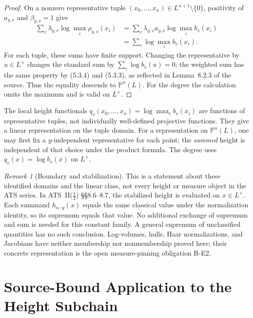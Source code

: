 \documentclass[11pt,a4paper]{article}
\theoremstyle{definition}
\theoremstyle{remark}
\newtheorem{remark}[theorem]{Remark}
\begin{document}
\begin{proof}
On a nonzero representative tuple $(x_0,\dots,x_n)\in L^{n+1}\setminus\{0\}$,
positivity of $a_{y,v}$ and $\beta_{y,v}=1$ give
\begin{align*}
\sum_v\lambda_{y,v}\log\max_i\rho_{y,v}(x_i)
&=\sum_v\lambda_{y,v}a_{y,v}\log\max_i b_v(x_i)\\
&=\sum_v\log\max_i b_v(x_i).
\end{align*}
For each tuple, these sums have finite support. Changing the representative
by $u\in L^\times$ changes the standard sum by
$\sum_v\log b_v(u)=0$; the weighted sum has the same property by (5.3.4)
and (5.3.3), as reflected in Lemma~8.2.3 of the source.
Thus the equality descends to $\mathbb P^n(L)$.
For the degree the calculation omits the maximum and is valid on
$L^\times$.
\end{proof}

The local height functionals
$q_v(x_0,\dots,x_n)=\log\max_i b_v(x_i)$ are functions of representative
tuples, not individually well-defined projective functions.
They give a linear representation on the tuple domain.
For a representation on $\mathbb P^n(L)$, one may first fix a
$y$-independent representative for each point; the \emph{summed} height
is independent of that choice under the product formula.
The degree uses $q_v(x)=\log b_v(x)$ on $L^\times$.

\begin{remark}[Boundary and stabilization]\label{rem:boundary}
This is a statement about these identified domains and the linear class,
not every height or measure object in the ATS series.
In ATS~II($\tfrac12$) \S\S8.6--8.7, the stabilized height is evaluated on
$x\in L^\times$. Each summand $h_{\alpha\cdot y}(x)$ equals the same
classical value under the normalization identity, so its supremum equals
that value. No additional exchange of supremum and sum is needed for this
constant family. A general supremum of unclassified quantities has no
such conclusion. Log-volumes, hulls, Haar normalizations, and Jacobians
have neither membership nor nonmembership proved here; their concrete
representation is the open measure-pinning obligation R-E2.
\end{remark}

\section{Source-Bound Application to the Height Subchain}\label{sec:sourcebound}
\end{document}
